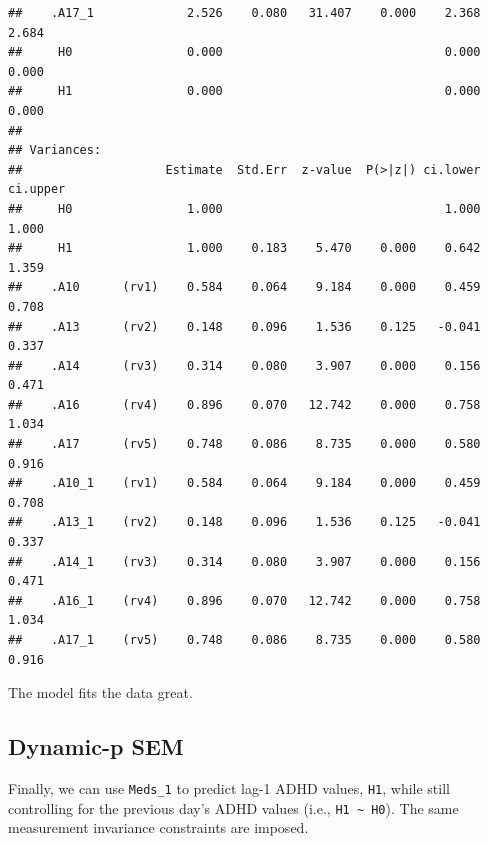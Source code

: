 \documentclass[]{article}
\begin{document}
\begin{verbatim}
##    .A17_1             2.526    0.080   31.407    0.000    2.368    2.684
##     H0                0.000                               0.000    0.000
##     H1                0.000                               0.000    0.000
## 
## Variances:
##                    Estimate  Std.Err  z-value  P(>|z|) ci.lower ci.upper
##     H0                1.000                               1.000    1.000
##     H1                1.000    0.183    5.470    0.000    0.642    1.359
##    .A10      (rv1)    0.584    0.064    9.184    0.000    0.459    0.708
##    .A13      (rv2)    0.148    0.096    1.536    0.125   -0.041    0.337
##    .A14      (rv3)    0.314    0.080    3.907    0.000    0.156    0.471
##    .A16      (rv4)    0.896    0.070   12.742    0.000    0.758    1.034
##    .A17      (rv5)    0.748    0.086    8.735    0.000    0.580    0.916
##    .A10_1    (rv1)    0.584    0.064    9.184    0.000    0.459    0.708
##    .A13_1    (rv2)    0.148    0.096    1.536    0.125   -0.041    0.337
##    .A14_1    (rv3)    0.314    0.080    3.907    0.000    0.156    0.471
##    .A16_1    (rv4)    0.896    0.070   12.742    0.000    0.758    1.034
##    .A17_1    (rv5)    0.748    0.086    8.735    0.000    0.580    0.916
\end{verbatim}

The model fits the data great.

\subsection{Dynamic-p SEM}\label{dynamic-p-sem}

Finally, we can use \texttt{Meds\_1} to predict lag-1 ADHD values,
\texttt{H1}, while still controlling for the previous day's ADHD values
(i.e., \texttt{H1\ \textasciitilde{}\ H0}). The same measurement
invariance constraints are imposed.
\end{document}
